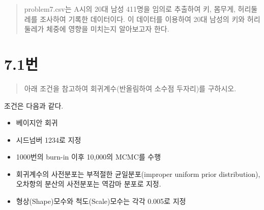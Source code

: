 \documentclass[
  letterpaper,
  DIV=11,
  numbers=noendperiod]{scrreprt}
\providecommand{\tightlist}{%
  \setlength{\itemsep}{0pt}\setlength{\parskip}{0pt}}\usepackage{longtable,booktabs,array}
\begin{document}

\begin{quote}
problem7.csv는 A시의 20대 남성 411명을 임의로 추출하여 키, 몸무게,
허리둘레를 조사하여 기록한 데이터이다. 이 데이터를 이용하여 20대 남성의
키와 허리둘레가 체중에 영향을 미치는지 알아보고자 한다.
\end{quote}

\hypertarget{uxbc88-37}{%
\section*{7.1번}\label{uxbc88-37}}


\begin{quote}
아래 조건을 참고하여 회귀계수(반올림하여 소수점 두자리)를 구하시오.
\end{quote}

조건은 다음과 같다.

\begin{itemize}
\tightlist
\item
  베이지안 회귀
\item
  시드넘버 1234로 지정
\item
  1000번의 burn-in 이후 10,000의 MCMC를 수행
\item
  회귀계수의 사전분포는 부적절한 균일분포(improper uniform prior
  distribution), 오차항의 분산의 사전분포는 역감마 분포로 지정.
\item
  형상(Shape)모수와 척도(Scale)모수는 각각 0.005로 지정
\end{itemize}
\end{document}
